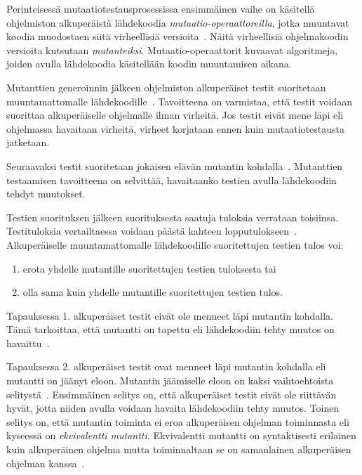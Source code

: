 \documentclass[finnish, grading]{tktltiki2}
\theoremstyle{definition}
\theoremstyle{remark}
\begin{document}
Perinteisessä mutaatiotestausprosessissa ensimmäinen vaihe on käsitellä ohjelmiston alkuperäistä lähdekoodia \textit{mutaatio-operaattoreilla}, jotka muuntavat koodia muodostaen siitä virheellisiä versioita~\cite[s. 869]{Ma:Harrold:Kwon:2006}. Näitä virheellisiä ohjelmakoodin versioita kutsutaan \textit{mutanteiksi}. Mutaatio-operaattorit kuvaavat algoritmeja, joiden avulla lähdekoodia käsitellään koodin muuntamisen aikana.

Mutanttien generoinnin jälkeen ohjelmiston alkuperäiset testit suoritetaan muuntamattomalle lähdekoodille~\cite[s. 652]{Jia:Harman:2011}. Tavoitteena on varmistaa, että testit voidaan suorittaa alkuperäiselle ohjelmalle ilman virheitä. Jos testit eivät mene läpi eli ohjelmassa havaitaan virheitä, virheet korjataan ennen kuin mutaatiotestausta jatketaan. 

Seuraavaksi testit suoritetaan jokaisen elävän mutantin kohdalla~\cite[s. 35]{Offutt:Untch:2001}. Mutanttien testaamisen tavoitteena on selvittää, havaitaanko testien avulla lähdekoodiin tehdyt muutokset. 

Testien suorituksen jälkeen suorituksesta saatuja tuloksia verrataan toisiinsa. Testituloksia vertailtaessa voidaan päästä kahteen lopputulokseen~\cite[s. 36]{DeMillo:Lipton:Sayward:1978}. Alkuperäiselle muuntamattomalle lähdekoodille suoritettujen testien tulos voi: 
\begin{enumerate}
  \item erota yhdelle mutantille suoritettujen testien tuloksesta tai
  \item olla sama kuin yhdelle mutantille suoritettujen testien tulos.
\end{enumerate}

Tapauksessa 1. alkuperäiset testit eivät ole menneet läpi mutantin kohdalla. Tämä tarkoittaa, että mutantti on tapettu eli lähdekoodiin tehty muutos on havaittu~\cite[s. 36]{DeMillo:Lipton:Sayward:1978}.

Tapauksessa 2. alkuperäiset testit ovat menneet läpi mutantin kohdalla eli mutantti on jäänyt eloon. Mutantin jäämiselle eloon on kaksi vaihtoehtoista selitystä~\cite[s. 36]{DeMillo:Lipton:Sayward:1978}. Ensimmäinen selitys on, että alkuperäiset testit eivät ole riittävän hyvät, jotta niiden avulla voidaan havaita lähdekoodiin tehty muutos. Toinen selitys on, että mutantin toiminta ei eroa alkuperäisen ohjelman toiminnasta eli kyseessä on \textit{ekvivalentti mutantti}. Ekvivalentti mutantti on syntaktisesti erilainen kuin alkuperäinen ohjelma mutta toiminnaltaan se on samanlainen alkuperäisen ohjelman kanssa~\cite[s. 652]{Jia:Harman:2011}.
\end{document}
